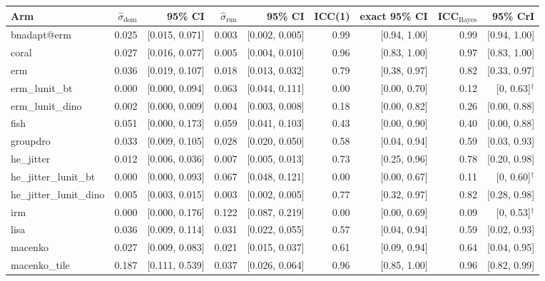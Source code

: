 \begin{tabular}{lrrrrrrrr}
\toprule
Arm & $\hat\sigma_\text{dom}$ & 95\% CI & $\hat\sigma_\text{run}$ & 95\% CI & ICC(1) & exact 95\% CI & ICC$_\text{Bayes}$ & 95\% CrI \\
\midrule
bnadapt@erm & 0.025 & [0.015, 0.071] & 0.003 & [0.002, 0.005] & 0.99 & [0.94, 1.00] & 0.99 & [0.94, 1.00] \\
coral & 0.027 & [0.016, 0.077] & 0.005 & [0.004, 0.010] & 0.96 & [0.83, 1.00] & 0.97 & [0.83, 1.00] \\
erm & 0.036 & [0.019, 0.107] & 0.018 & [0.013, 0.032] & 0.79 & [0.38, 0.97] & 0.82 & [0.33, 0.97] \\
erm\_lunit\_bt & 0.000 & [0.000, 0.094] & 0.063 & [0.044, 0.111] & 0.00 & [0.00, 0.70] & 0.12 & [0, 0.63]$^\dagger$ \\
erm\_lunit\_dino & 0.002 & [0.000, 0.009] & 0.004 & [0.003, 0.008] & 0.18 & [0.00, 0.82] & 0.26 & [0.00, 0.88] \\
fish & 0.051 & [0.000, 0.173] & 0.059 & [0.041, 0.103] & 0.43 & [0.00, 0.90] & 0.40 & [0.00, 0.88] \\
groupdro & 0.033 & [0.009, 0.105] & 0.028 & [0.020, 0.050] & 0.58 & [0.04, 0.94] & 0.59 & [0.03, 0.93] \\
he\_jitter & 0.012 & [0.006, 0.036] & 0.007 & [0.005, 0.013] & 0.73 & [0.25, 0.96] & 0.78 & [0.20, 0.98] \\
he\_jitter\_lunit\_bt & 0.000 & [0.000, 0.093] & 0.067 & [0.048, 0.121] & 0.00 & [0.00, 0.67] & 0.11 & [0, 0.60]$^\dagger$ \\
he\_jitter\_lunit\_dino & 0.005 & [0.003, 0.015] & 0.003 & [0.002, 0.005] & 0.77 & [0.32, 0.97] & 0.82 & [0.28, 0.98] \\
irm & 0.000 & [0.000, 0.176] & 0.122 & [0.087, 0.219] & 0.00 & [0.00, 0.69] & 0.09 & [0, 0.53]$^\dagger$ \\
lisa & 0.036 & [0.009, 0.114] & 0.031 & [0.022, 0.055] & 0.57 & [0.04, 0.94] & 0.59 & [0.02, 0.93] \\
macenko & 0.027 & [0.009, 0.083] & 0.021 & [0.015, 0.037] & 0.61 & [0.09, 0.94] & 0.64 & [0.04, 0.95] \\
macenko\_tile & 0.187 & [0.111, 0.539] & 0.037 & [0.026, 0.064] & 0.96 & [0.85, 1.00] & 0.96 & [0.82, 0.99] \\

\end{tabular}
